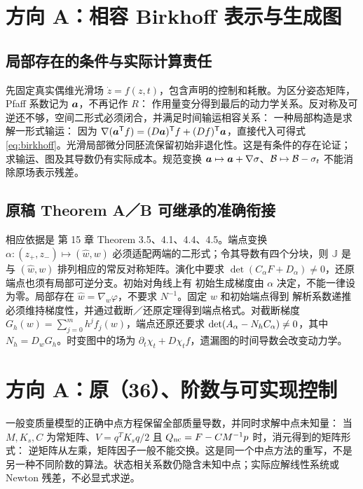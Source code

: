 \PaperPage
\section{方向 A：相容 Birkhoff 表示与生成图}
\subsection{局部存在的条件与实际计算责任}
先固定真实偶维光滑场 $\dot z=f(z,t)$，包含声明的控制和耗散。为区分姿态矩阵，Pfaff 系数记为 $\bm a$，不再记作 $R$：
\EqBirkhoff
作用量变分得到最后的动力学关系。反对称及可逆还不够，空间二形式必须闭合，并满足时间输运相容关系：
\EqCompatibility
一种局部构造是求解一形式输运：
\EqTransport
因为 $\nabla(\bm a^{\mathsf T} f)=(D\bm a)^{\mathsf T} f+(Df)^{\mathsf T}\bm a$，直接代入可得式\eqref{eq:birkhoff}。光滑局部微分同胚流保留初始非退化性。这是有条件的存在论证；求输运、图及其导数仍有实际成本。规范变换 $\bm a\mapsto\bm a+\nabla\sigma$、$\mathcal B\mapsto\mathcal B-\sigma_t$ 不能消除原场表示残差。

\subsection{原稿 Theorem A／B 可继承的准确衔接}
相应依据是 \citet{fengqin2010} 第 15 章 Theorem 3.5、4.1、4.4、4.5。端点变换 $\alpha:(z_+,z_-)\mapsto(\widehat w,w)$ 必须适配两端的二形式；令其导数有四个分块，则
\EqEndpoint
$\mathbb J$ 是与 $(\widehat w,w)$ 排列相应的常反对称矩阵。演化中要求 $\det(C_\alpha F+D_\alpha)\ne0$，还原端点也须有局部可逆分支。初始对角线上有
\EqInitialGenerating
初始生成梯度由 $\alpha$ 决定，不能一律设为零。局部存在 $\widehat w=\nabla_w\varphi$，不要求 $N^{-1}$。固定 $w$ 和初始端点得到
\EqGeneratingTime
解析系数递推必须维持梯度性，并通过截断／还原定理得到端点格式。对截断梯度 $G_h(w)=\sum_{j=0}^{m}h^jf_j(w)$，端点还原还要求 $\det(A_\alpha-N_hC_\alpha)\ne0$，其中 $N_h=D_wG_h$。时变图中的场为 $\partial_t\chi_t+D\chi_t f$，遗漏图的时间导数会改变动力学。

\PaperPage
\section{方向 A：原（36）、阶数与可实现控制}
一般变质量模型的正确中点方程保留全部质量导数，并同时求解中点未知量：
\EqMidpoint
当 $M,K_s,C$ 为常矩阵、$V=q^TK_sq/2$ 且 $Q_{\rm nc}=F-CM^{-1}p$ 时，消元得到的矩阵形式：
\EqOriginalThirtySix
逆矩阵从左乘，矩阵因子一般不能交换。这是同一个中点方法的重写，不是另一种不同阶数的算法。状态相关系数仍隐含未知中点；实际应解线性系统或 Newton 残差，不必显式求逆。

